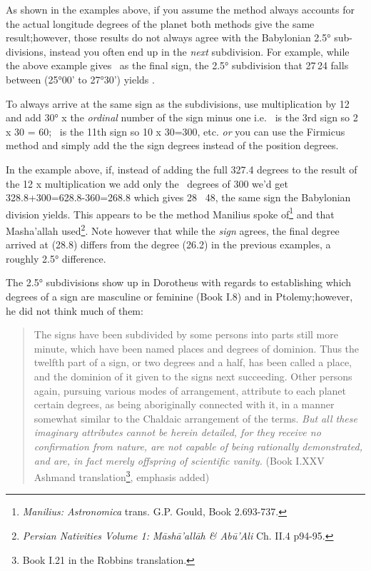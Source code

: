 As shown in the examples above, if you assume the method always accounts for the actual longitude degrees of the planet both methods give the same result;however, those results do not always agree with the Babylonian 2.5° sub-divisions, instead you often end up in the \textsl{next} subdivision. For example, while the above example gives \Capricorn\, as the final sign, the 2.5° subdivision that 27\Aquarius\,24 falls between (25°00' to 27°30') yields \Sagittarius.  

To always arrive at the same sign as the subdivisions, use multiplication by 12 and add 30° x the \textsl{ordinal} number of the sign minus one i.e. \Gemini\, is the 3rd sign so 2 x 30 = 60; \Aquarius\, is the 11th sign so 10 x 30=300, etc. \textsl{or} you can use the Firmicus method and simply add the the sign degrees instead of the position degrees. 

In the example above, if, instead of adding the full 327.4 degrees to the result of the 12 x multiplication we add only the \Aquarius\, degrees of 300 we'd get 328.8+300=628.8-360=268.8 which gives 28 \Sagittarius\, 48, the same sign the Babylonian division yields. This appears to be the method Manilius spoke of\footnote{\textsl{Manilius: Astronomica} trans. G.P. Gould, Book 2.693-737.} and that Masha'allah used\footnote{\textsl{Persian Nativities Volume 1: Māshā'allāh \& Abū'Ali} Ch. II.4 p94-95.}. Note however that while the \textsl{sign} agrees, the final degree arrived at (28.8) differs from the degree (26.2) in the previous examples, a roughly 2.5° difference.

The 2.5° subdivisions show up in Dorotheus with regards to establishing which degrees of a sign are masculine or feminine (Book I.8) and in Ptolemy;however, he did not think much of them:
\begin{quote}
The signs have been subdivided by some persons into parts still more minute, which have been named places and degrees of dominion. Thus the twelfth part of a sign, or two degrees and a half, has been called a place, and the dominion of it given to the signs next succeeding. Other persons again, pursuing various modes of arrangement, attribute to each planet certain degrees, as being aboriginally connected with it, in a manner somewhat similar to the Chaldaic arrangement of the terms. \textsl{But all these imaginary attributes cannot be herein detailed, for they receive no confirmation from nature, are not capable of being rationally demonstrated, and are, in fact merely offspring of scientific vanity.} (Book I.XXV Ashmand translation\footnote{Book I.21 in the Robbins translation.}, emphasis added)
\end{quote}

